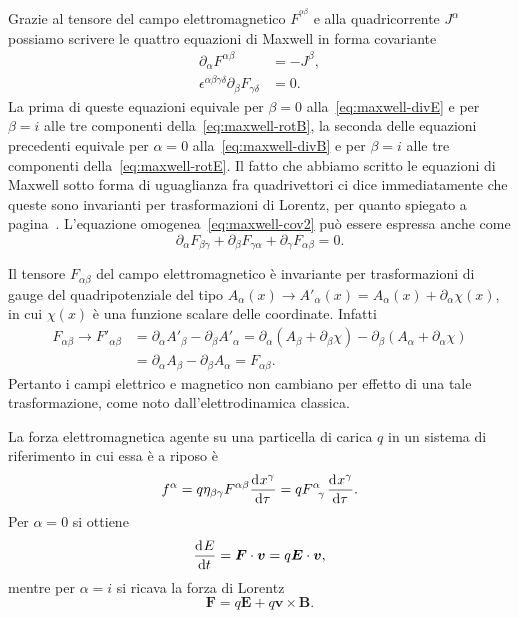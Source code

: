 Grazie al tensore del campo elettromagnetico $F^{^{\alpha\beta}}$ e alla
quadricorrente $J^{\alpha}$ possiamo scrivere le quattro equazioni di Maxwell
in forma covariante
\begin{subequations}
  \begin{align}
    \partial_{\alpha}F^{\alpha\beta} &= -J^{\beta}, \label{eq:maxwell-cov1} \\
    \epsilon^{\alpha\beta\gamma\delta} \partial_{\beta} F_{\gamma\delta} &=
    0. \label{eq:maxwell-cov2}
  \end{align}
\end{subequations}
La prima di queste equazioni equivale per $\beta=0$ alla~\eqref{eq:maxwell-divE}
e per $\beta = i$ alle tre componenti della~\eqref{eq:maxwell-rotB}, la seconda
delle equazioni precedenti equivale per $\alpha = 0$
alla~\eqref{eq:maxwell-divB} e per $\beta = i$ alle tre componenti
della~\eqref{eq:maxwell-rotE}.  Il fatto che abbiamo scritto le equazioni di
Maxwell sotto forma di uguaglianza fra quadrivettori ci dice immediatamente che
queste sono invarianti per trasformazioni di Lorentz, per quanto spiegato a
pagina~\pageref{invarianza-lorentz}.  L'equazione
omogenea~\eqref{eq:maxwell-cov2} può essere espressa anche come
\begin{equation}
  \partial_{\alpha}F_{\beta\gamma} + \partial_{\beta}F_{\gamma\alpha}
  + \partial_{\gamma}F_{\alpha\beta} = 0.
\end{equation}

Il tensore $F_{\alpha\beta}$ del campo elettromagnetico è invariante per
trasformazioni di gauge del quadripotenziale del tipo
$A_{\alpha}(x) \to A'_{\alpha}(x) = A_{\alpha}(x) + \partial_{\alpha}\chi(x)$,
in cui $\chi(x)$ è una funzione scalare delle coordinate.  Infatti
\begin{equation}
  \begin{split}
    F_{\alpha\beta} \to F'_{\alpha\beta} &= \partial_{\alpha}A'_{\beta}
    - \partial_{\beta}A'_{\alpha} = \partial_{\alpha}(A_{\beta}
    + \partial_{\beta}\chi) - \partial_{\beta}(A_{\alpha}
    + \partial_{\alpha}\chi) \\
    &= \partial_{\alpha}A_{\beta} - \partial_{\beta}A_{\alpha} =
    F_{\alpha\beta}.
  \end{split}
\end{equation}
Pertanto i campi elettrico e magnetico non cambiano per effetto di una tale
trasformazione, come noto dall'elettrodinamica classica.

La forza elettromagnetica agente su una particella di carica $q$ in un sistema
di riferimento in cui essa è a riposo è
\begin{equation}
  \label{eq:quadriforza-lorentz}
  f^{\alpha} = q\eta_{\beta\gamma}F^{\alpha\beta} \toder{x^{\gamma}}{\tau} = q
  \tensor{F}{^{\alpha}_{\gamma}} \toder{x^{\gamma}}{\tau}.
\end{equation}
Per $\alpha = 0$ si ottiene
\begin{equation}
  \frac{{\mathop{}\!\mathrm{d}^{}}E}{\mathop{}\!\mathrm{d} {t}^{}} = \bm{F}\cdot\bm{v} = q\bm{E}\cdot\bm{v},
\end{equation}
mentre per $\alpha = i$ si ricava la forza di Lorentz
\begin{equation}
  \bm{F} = q\bm{E} + q\bm{v}\times\bm{B}.
\end{equation}

